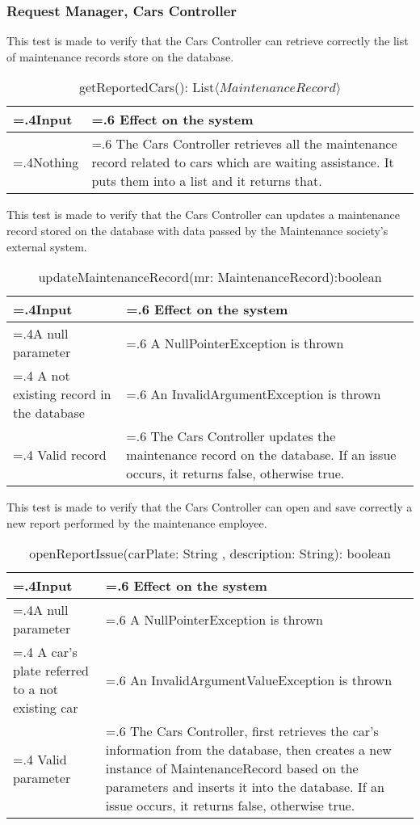 \documentclass[10pt, a4paper,titlepage]{article}
\begin{document}
\subsubsection{Request Manager, Cars Controller}
This test is made to verify that the Cars Controller can retrieve correctly the list of maintenance records store on the database.
\begin{table}[h]
\caption{getReportedCars(): List$\langle MaintenanceRecord \rangle$}
\begin{tabularx}{\textwidth}{|>{\hsize=.4\hsize}X|>{\hsize=.6\hsize}X|}
\hline
Input & Effect on the system\\
\hline
Nothing & The Cars Controller retrieves all the maintenance record related to cars which are waiting assistance. It puts them into a list and it returns that.\\
\hline
\end{tabularx}
\end{table}
\linebreak
This test is made to verify that the Cars Controller can updates a maintenance record stored on the database with data passed by the Maintenance society’s external system.
\begin{table}[h]
\caption{updateMaintenanceRecord(mr: MaintenanceRecord):boolean}
\begin{tabularx}{\textwidth}{|>{\hsize=.4\hsize}X|>{\hsize=.6\hsize}X|}
\hline
Input & Effect on the system\\
\hline
A null parameter & A NullPointerException is thrown\\
\hline
A not existing record in the database & An InvalidArgumentException is thrown\\
\hline
Valid record & The Cars Controller updates the maintenance record on the database. If an issue occurs, it returns false, otherwise true.\\
\hline
\end{tabularx}
\end{table}
\pagebreak
\linebreak
This test is made to verify that the Cars Controller can open and save correctly a new report performed by the maintenance employee.
\begin{table}[h]
\caption{openReportIssue(carPlate: String , description: String): boolean}
\begin{tabularx}{\textwidth}{|>{\hsize=.4\hsize}X|>{\hsize=.6\hsize}X|}
\hline
Input & Effect on the system\\
\hline
A null parameter & A NullPointerException is thrown\\
\hline
A car's plate referred to a not existing car & An InvalidArgumentValueException is thrown\\
\hline
Valid parameter & The Cars Controller, first retrieves the car’s information from the database, then creates a new instance of MaintenanceRecord based on the parameters and inserts it into the database. If an issue occurs, it returns false, otherwise true.\\
\hline
\end{tabularx}
\end{table}
\end{document}

